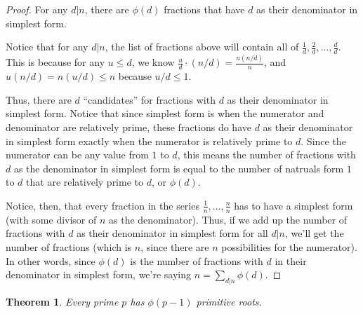 \documentclass{article}
\newtheorem{thm}{Theorem}[section]
\numberwithin{equation}{thm}
\begin{document}
\begin{proof}
  For any $d | n$, there are $\phi(d)$ fractions that have $d$ as their denominator in simplest form.

  Notice that for any $d | n$, the list of fractions above will contain all of $\frac{1}{d}, \frac{2}{d}, \ldots, \frac{d}{d}$. This is because for any $u \leq d$, we know $\frac{u}{d} \cdot (n/d) = \frac{u(n/d)}{n}$, and $u(n/d) = n(u/d) \leq n$ because $u/d \leq 1$.

  Thus, there are $d$ ``candidates'' for fractions with $d$ as their denominator in simplest form. Notice that since simplest form is when the numerator and denominator are relatively prime, these fractions do have $d$ as their denominator in simplest form exactly when the numerator is relatively prime to $d$. Since the numerator can be any value from $1$ to $d$, this means the number of fractions with $d$ as the denominator in simplest form is equal to the number of natruals form $1$ to $d$ that are relatively prime to $d$, or $\phi(d)$.

  Notice, then, that every fraction in the series $\frac{1}{n}, \ldots, \frac{n}{n}$ has to have a simplest form (with some divisor of $n$ as the denominator). Thus, if we add up the number of fractions with $d$ as their denominator in simplest form for all $d | n$, we'll get the number of fractions (which is $n$, since there are $n$ possibilities for the numerator). In other words, since $\phi(d)$ is the number of fractions with $d$ in their denominator in simplest form, we're saying $n = \sum_{d | n} \phi(d)$.
\end{proof}



\begin{thm} \label{6.17}
  Every prime $p$ has $\phi(p-1)$ primitive roots.
\end{thm}
\end{document}
